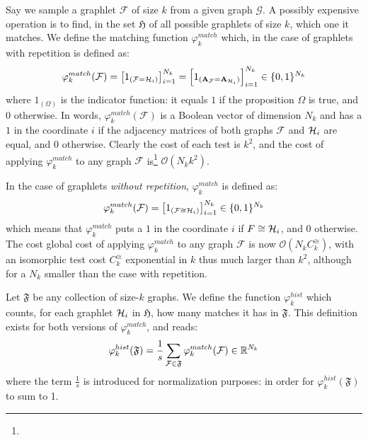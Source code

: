 Say we sample a graphlet $\mathcal{F}$ of size $k$ from a given graph $\mathcal{G}$. A possibly expensive operation is to find, in the set $\mathfrak{H}$ of all possible graphlets of size $k$, which one it matches. We define the matching function $\varphi_{k}^{match}$ which, in the case of graphlets with repetition is defined as: 
\[
\varphi_k^{match}(\mathcal{F}) = \left[ 1_{(\mathcal{F} = \mathcal{H}_i)}\right]_{i=1}^{N_k}= \left[ 1_{(\mathbf{A}_\mathcal{F} = \mathbf{A}_{\mathcal{H}_i})}\right]_{i=1}^{N_k} \in \{0,1\}^{N_k}
\]
where $1_{(\Omega)}$ is the indicator function: it equals $1$ if the proposition $\Omega$ is true, and $0$ otherwise. 
In words, $\varphi_k^{match}(\mathcal{F})$ is a Boolean vector of dimension $N_k$ and has a $1$ in the coordinate $i$ if the adjacency matrices of both graphs $\mathcal{F}$ and $\mathcal{H}_i$ are equal, and $0$ otherwise. Clearly the cost of each test is $k^2$, and the cost of applying $\varphi^{match}_k$ to any graph $\mathcal{F}$ is\footnote{} $\mathcal{O}(N_k k^2)$. 

In the case of graphlets \emph{without repetition}, $\varphi_k^{match}$ is defined as:
\[
\varphi_k^{match}(\mathcal{F}) = \left[ 1_{(\mathcal{F} \cong \mathcal{H}_i)}\right]_{i=1}^{N_k} \in \{0,1\}^{N_k}
\]
which means that $\varphi_k^{match}$ puts a $1$ in the coordinate $i$ if $F\cong \mathcal{H}_i$, and $0$ otherwise. The cost global cost of applying $\varphi^{match}_k$ to any graph $\mathcal{F}$ is now $\mathcal{O}(N_k C^{\cong}_k)$, with an isomorphic test cost $C^{\cong}_k$ exponential in $k$ thus much larger than $k^2$, although for a $N_k$ smaller than the case with repetition.  

Let $\mathfrak{F}$ be any collection of size-$k$ graphs. We define the function $\varphi_k^{hist}$ which counts, for each graphlet $\mathcal{H}_i$ in $\mathfrak{H}$, how many matches it has in $\mathfrak{F}$. This definition exists for both versions of $\varphi_k^{match}$, and reads:
\begin{align}
	\label{eq:def:phi_hist}
\varphi_k^{hist}(\mathfrak{F})=\frac{1}{s}\sum_{\mathcal{F}\in\mathfrak{F}} \varphi_k^{match} (\mathcal{F}) \in \mathbb{R}^{N_k}
\end{align}
where the term $\frac{1}{s}$ is introduced for normalization purposes: in order for  $\varphi_k^{hist}(\mathfrak{F})$ to sum to 1. %


